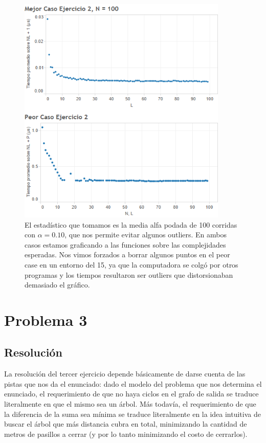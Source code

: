 \documentclass{article}
\theoremstyle{definition}
\theoremstyle{remark}
\begin{document}
\begin{figure}
\centering
\includegraphics[width=10cm]{ex2}
\caption{El estadístico que tomamos es la media alfa podada de 100 corridas con $\alpha = 0.10$, que nos permite evitar algunos outliers. En ambos casos estamos graficando a las funciones sobre las complejidades esperadas. Nos vimos forzados a borrar algunos puntos en el peor case en un entorno del 15, ya que la computadora se colgó por otros programas y los tiempos resultaron ser outliers que distorsionaban demasiado el gráfico.\label{grf:ex2}}
\end{figure}

\pagebreak

\section{Problema 3}

\subsection{Resolución}

La resolución del tercer ejercicio depende básicamente de darse cuenta de las pistas que nos da el enunciado: dado el modelo del problema que nos determina el enunciado, el requerimiento de que no haya ciclos en el grafo de salida se traduce literalmente en que el mismo sea un árbol. Más todavía, el requerimiento de que la diferencia de la suma sea mínima se traduce literalmente en la idea intuitiva de buscar el árbol que más distancia cubra en total, minimizando la cantidad de metros de pasillos a cerrar (y por lo tanto minimizando el costo de cerrarlos).
\end{document}
